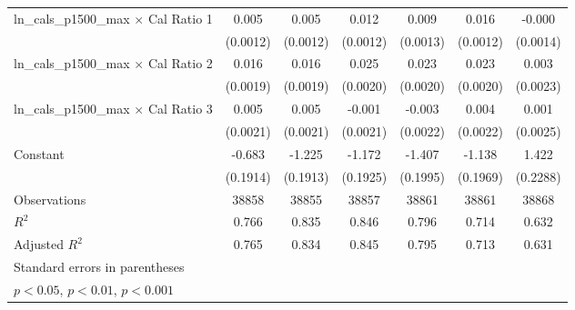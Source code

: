 {\begin{tabular}{l*{6}{c}}
\addlinespace
ln\_cals\_p1500\_max $\times$ Cal Ratio 1&       0.005\sym{***}&       0.005\sym{***}&       0.012\sym{***}&       0.009\sym{***}&       0.016\sym{***}&      -0.000         \\
                    &    (0.0012)         &    (0.0012)         &    (0.0012)         &    (0.0013)         &    (0.0012)         &    (0.0014)         \\
\addlinespace
ln\_cals\_p1500\_max $\times$ Cal Ratio 2&       0.016\sym{***}&       0.016\sym{***}&       0.025\sym{***}&       0.023\sym{***}&       0.023\sym{***}&       0.003         \\
                    &    (0.0019)         &    (0.0019)         &    (0.0020)         &    (0.0020)         &    (0.0020)         &    (0.0023)         \\
\addlinespace
ln\_cals\_p1500\_max $\times$ Cal Ratio 3&       0.005\sym{*}  &       0.005\sym{*}  &      -0.001         &      -0.003         &       0.004\sym{*}  &       0.001         \\
                    &    (0.0021)         &    (0.0021)         &    (0.0021)         &    (0.0022)         &    (0.0022)         &    (0.0025)         \\
\addlinespace
Constant            &      -0.683\sym{***}&      -1.225\sym{***}&      -1.172\sym{***}&      -1.407\sym{***}&      -1.138\sym{***}&       1.422\sym{***}\\
                    &    (0.1914)         &    (0.1913)         &    (0.1925)         &    (0.1995)         &    (0.1969)         &    (0.2288)         \\
\midrule
Observations        &       38858         &       38855         &       38857         &       38861         &       38861         &       38868         \\
\(R^{2}\)           &       0.766         &       0.835         &       0.846         &       0.796         &       0.714         &       0.632         \\
Adjusted \(R^{2}\)  &       0.765         &       0.834         &       0.845         &       0.795         &       0.713         &       0.631         \\
\bottomrule
\multicolumn{7}{l}{\footnotesize Standard errors in parentheses}\\
\multicolumn{7}{l}{\footnotesize \sym{*} \(p<0.05\), \sym{**} \(p<0.01\), \sym{***} \(p<0.001\)}\\
\end{tabular}
}
